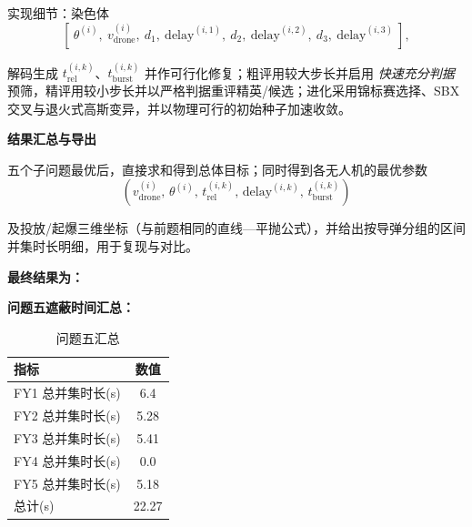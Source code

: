 \documentclass[withoutpreface,bwprint]{cumcmthesis} %
\begin{document}
实现细节：染色体
\[
[\ \theta^{(i)},\ v_{\text{drone}}^{(i)},\ d_1,\ \text{delay}^{(i,1)},\ d_2,\ \text{delay}^{(i,2)},\ d_3,\ \text{delay}^{(i,3)}\ ],
\]

解码生成 $t_{\text{rel}}^{(i,k)}$、$t_{\text{burst}}^{(i,k)}$ 并作可行化修复；粗评用较大步长并启用 \emph{快速充分判据} 预筛，精评用较小步长并以严格判据重评精英/候选；进化采用锦标赛选择、SBX 交叉与退火式高斯变异，并以物理可行的初始种子加速收敛。

\textbf{结果汇总与导出}

五个子问题最优后，直接求和得到总体目标；同时得到各无人机的最优参数
\[
(v_{\text{drone}}^{(i)},\,\theta^{(i)},\,t_{\text{rel}}^{(i,k)},\,\text{delay}^{(i,k)},\,t_{\text{burst}}^{(i,k)})
\]

及投放/起爆三维坐标（与前题相同的直线—平抛公式），并给出按导弹分组的区间并集时长明细，用于复现与对比。

\textbf{最终结果为：}

\textbf{问题五遮蔽时间汇总：}
\begin{table}[H]
	\centering
	\caption{问题五汇总}
	\label{tab:problem5_summary}
	\begin{tabular}{lc}
		\toprule
		指标 & 数值 \\
		\midrule
		FY1 总并集时长(s) & 6.4 \\
		FY2 总并集时长(s) & 5.28 \\
		FY3 总并集时长(s) & 5.41 \\
		FY4 总并集时长(s) & 0.0 \\
		FY5 总并集时长(s) & 5.18 \\
		总计(s) & 22.27 \\
		\bottomrule
	\end{tabular}
\end{table}
\end{document}
